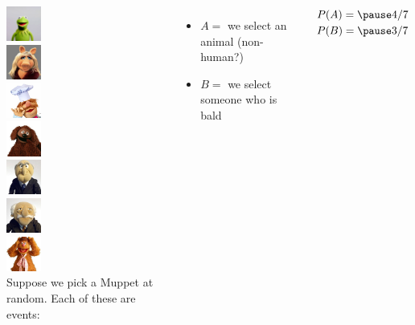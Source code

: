 \documentclass{beamer}\usepackage[]{graphicx}\usepackage[]{color}
\begin{document}
\begin{darkframes}
\begin{frame}
  \begin{columns}[onlytextwidth]
      \includegraphics[width=0.45in]{kermitthefrog} \\
      \includegraphics[width=0.45in]{misspiggy} \\
      \includegraphics[width=0.45in]{swedishchef} \\
      \includegraphics[width=0.45in]{rowlf} \\
      \includegraphics[width=0.45in]{statler} \\
      \includegraphics[width=0.45in]{waldorf} \\
      \includegraphics[width=0.45in]{fozziebear} \\
      Suppose we pick a Muppet at random. Each of these are events:
      \begin{itemize}[<+->]
        \item $A = $ we select an animal (non-human?)
        \item $B = $ we select someone who is bald
      \end{itemize}
      \pause
      $P(A) = \pause 4/7$ \qquad $P(B) = \pause 3/7$
  \end{columns}
\end{frame}


\end{darkframes}
\end{document}
